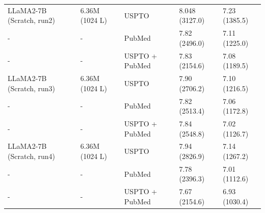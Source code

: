 \begin{table}[h]
\begin{tabularx}{1\textwidth}{lXXXX}
LLaMA2-7B (Scratch, run2) & 6.36M (1024 L) & USPTO  & 8.048 (3127.0) & 7.23 (1385.5) \\ %
- & - & PubMed & 7.82 (2496.0) & 7.11 (1225.0) \\ %
- & - & USPTO + PubMed & 7.83 (2154.6) & 7.08 (1189.5) \\ %
\hline

LLaMA2-7B (Scratch, run3) & 6.36M (1024 L) & USPTO  & 7.90 (2706.2) & 7.10 (1216.5) \\ %
- & - & PubMed & 7.82 (2513.4) & 7.06 (1172.8) \\ %
- & - & USPTO + PubMed & 7.84 (2548.8) & 7.02 (1126.7) \\ %
\hline

LLaMA2-7B (Scratch, run4) & 6.36M (1024 L) & USPTO  & 7.94 (2826.9) & 7.14 (1267.2) \\ %
- & - & PubMed & 7.78 (2396.3) & 7.01 (1112.6) \\ %
- & - & USPTO + PubMed & 7.67 (2154.6) & 6.93 (1030.4) \\ %
\hline



\bottomrule
\end{tabularx}
\label{tab:div_vs_ce_val}

\end{table}






